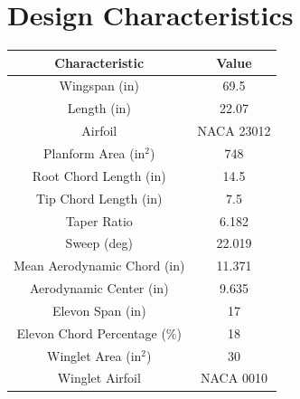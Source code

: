 \section{Design Characteristics}

    \begin{center}
    \begin{tabular}{|c|c|} 
        \hline
        \textbf{Characteristic} & \textbf{Value} \\ \hline
        Wingspan (in) & 69.5 \\ \hline
        Length (in) & 22.07 \\ \hline
        Airfoil & NACA 23012 \\ \hline
        Planform Area (in$^2$) & 748 \\ \hline
        Root Chord Length (in) & 14.5 \\ \hline
        Tip Chord Length (in) & 7.5 \\ \hline
        Taper Ratio & 6.182 \\ \hline
        Sweep (deg) & 22.019 \\ \hline
        Mean Aerodynamic Chord (in) &  11.371 \\ \hline
        Aerodynamic Center (in) & 9.635 \\ \hline
        Elevon Span (in) & 17 \\ \hline
        Elevon Chord Percentage (\%) & 18 \\ \hline
        Winglet Area (in$^2$) & 30 \\ \hline
        Winglet Airfoil & NACA 0010 \\
        \hline
    \end{tabular}
    \end{center}


